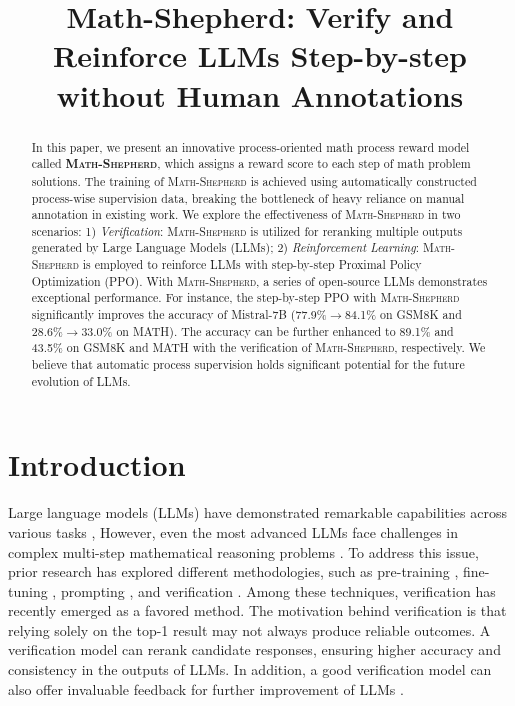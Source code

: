 \title{Math-Shepherd: Verify and Reinforce LLMs Step-by-step without Human Annotations}

\begin{abstract}
In this paper, we present an innovative process-oriented math process reward model called \textbf{\textsc{Math-Shepherd}}, which assigns a reward score to each step of math problem solutions. The training of \textsc{Math-Shepherd} is achieved using automatically constructed process-wise supervision data, breaking the bottleneck of heavy reliance on manual annotation in existing work. We explore the effectiveness of \textsc{Math-Shepherd} in two scenarios: 1) \textit{Verification}:  \textsc{Math-Shepherd} is utilized for reranking multiple outputs generated by Large Language Models (LLMs); 2) \textit{Reinforcement Learning}: \textsc{Math-Shepherd} is employed to reinforce LLMs with step-by-step Proximal Policy Optimization (PPO). With \textsc{Math-Shepherd}, a series of open-source LLMs demonstrates exceptional performance. For instance, the step-by-step PPO with \textsc{Math-Shepherd} significantly improves the accuracy of Mistral-7B (77.9\%$\to$84.1\% on GSM8K and 28.6\%$\to$33.0\% on MATH). The accuracy can be further enhanced to 89.1\% and 43.5\% on GSM8K and MATH with the verification of \textsc{Math-Shepherd}, respectively. We believe that automatic process supervision holds significant potential for the future evolution of LLMs.
\end{abstract}

\section{Introduction}

Large language models (LLMs) have demonstrated remarkable capabilities across various tasks \citep{park2023generative,kaddour2023challenges,song2306restgpt,li2023m,wang2023voyager,chen2023towards,zheng2023judging,wang2023large}, However, even the most advanced LLMs face challenges in complex multi-step mathematical reasoning problems \citep{lightman2023let,huang2023large}. To address this issue, prior research has explored different methodologies, such as pre-training \citep{azerbayev2023llemma}, fine-tuning \citep{luo2023wizardmath,yu2023metamath,wang2023making}, prompting \citep{cot,fu2022complexity}, and verification \citep{self-consistency,li-etal-2023-making,zhu-etal-2023-solving,leviathan2023fast}. Among these techniques, verification has recently emerged as a favored method. The motivation behind verification is that relying solely on the top-1 result may not always produce reliable outcomes. A verification model can rerank candidate responses, ensuring higher accuracy and consistency in the outputs of LLMs. In addition, a good verification model can also offer invaluable feedback for further improvement of LLMs \citep{uesato2022solving,wang2023making,pan2023let}.

